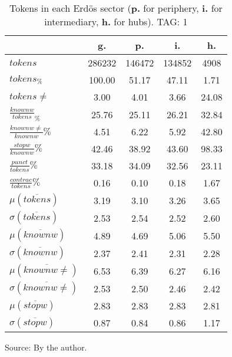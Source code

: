 \begin{table}[h!]
\begin{center}
	\caption{Tokens in each Erd\"os sector ({{\bf p.}} for periphery, {{\bf i.}} for intermediary, {{\bf h.}} for hubs). TAG: 1}\label{tab:tokensInline}
	\def\arraystretch{1.5}
\begin{tabular}{l || c | c | c | c}\hline
 & {\bf g.} & {\bf p.} & {\bf i.} & {\bf h.} \\\hline\hline
$tokens$ & 286232  & 146472  & 134852  & 4908 \\
$tokens_{\%}$ & 100.00  & 51.17  & 47.11  & 1.71 \\
$tokens \neq$ & 3.00  & 4.01  & 3.66  & 24.08 \\\hline
$\frac{knownw}{tokens}_\%$ & 25.76  & 25.11  & 26.21  & 32.84 \\
$\frac{knownw \neq}{knownw}\%$ & 4.51  & 6.22  & 5.92  & 42.80 \\\hline
$\frac{stopw}{knownw}\%$ & 42.46  & 38.92  & 43.60  & 98.33 \\
$\frac{punct}{tokens}\%$ & 33.18  & 34.09  & 32.56  & 23.11 \\
$\frac{contrac}{tokens}\%$ & 0.16  & 0.10  & 0.18  & 1.67 \\\hline\hline
$\mu(\overline{tokens})$ & 3.19  & 3.10  & 3.26  & 3.65 \\
$\sigma(\overline{tokens})$ & 2.53  & 2.54  & 2.52  & 2.60 \\\hline
$\mu(\overline{knownw})$ & 4.89  & 4.69  & 5.06  & 5.50 \\
$\sigma(\overline{knownw})$ & 2.37  & 2.41  & 2.31  & 2.28 \\\hline
$\mu(\overline{knownw \neq})$ & 6.53  & 6.39  & 6.27  & 6.16 \\
$\sigma(\overline{knownw \neq})$ & 2.53  & 2.50  & 2.46  & 2.42 \\\hline
$\mu(\overline{stopw})$ & 2.83  & 2.83  & 2.83  & 2.81 \\
$\sigma(\overline{stopw})$ & 0.87  & 0.84  & 0.86  & 1.17 \\\hline
\end{tabular}
\begin{flushleft}\footnotesize
		Source: By the author.\
\end{flushleft}
\end{center}
\end{table}
